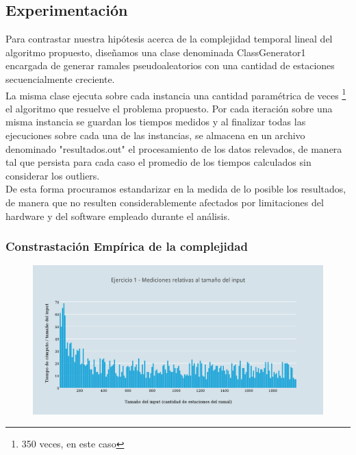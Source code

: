 \subsection{Experimentaci\'on}

Para contrastar nuestra hipótesis acerca de la complejidad temporal lineal del algoritmo propuesto, diseñamos una clase denominada ClassGenerator1 encargada de generar ramales pseudoaleatorios con una cantidad de estaciones secuencialmente creciente.\\ 
La misma clase ejecuta sobre cada instancia una cantidad paramétrica de veces \footnote{350 veces, en este caso} el algoritmo que resuelve el problema propuesto. Por cada iteración sobre una misma instancia se guardan los tiempos medidos y al finalizar todas las ejecuciones sobre cada una de las instancias, se almacena en un archivo denominado "resultados.out" el procesamiento de los datos relevados, de manera tal que persista para cada caso el promedio de los tiempos calculados sin considerar los outliers.\\
De esta forma procuramos estandarizar en la medida de lo posible los resultados, de manera que no resulten considerablemente afectados por limitaciones del hardware y del software empleado durante el análisis. \\
 \newpage

\subsubsection{Constrastaci\'on Emp\'irica de la complejidad}

  \begin{figure}[h!]
   \begin{center}
 	\includegraphics[scale=0.8]{imagenes/ej1/relativas.png}
	\label{estaciones}
   \end{center}
 \end{figure}


